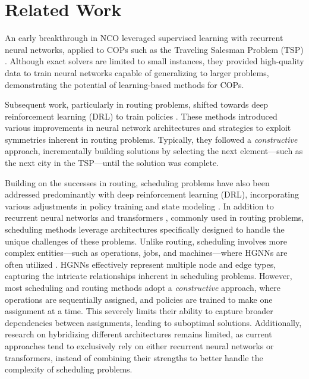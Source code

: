 \section{Related Work}
\label{sec:state_of_the_art}

An early breakthrough in NCO leveraged supervised learning with recurrent neural networks, applied to COPs such as the Traveling Salesman Problem (TSP) \citep{vinyals2015pointer}. Although exact solvers are limited to small instances, they provided high-quality data to train neural networks capable of generalizing to larger problems, demonstrating the potential of learning-based methods for COPs.

Subsequent work, particularly in routing problems, shifted towards deep reinforcement learning (DRL) to train policies \cite{kool2018attention, kwon2020pomo}. These methods introduced various improvements in neural network architectures and strategies to exploit symmetries inherent in routing problems. Typically, they followed a \emph{constructive} approach, incrementally building solutions by selecting the next element—such as the next city in the TSP—until the solution was complete.

Building on the successes in routing, scheduling problems have also been addressed predominantly with deep reinforcement learning (DRL), incorporating various adjustments in policy training and state modeling \cite{song2022flexible, wang2023flexible}. In addition to recurrent neural networks and transformers \cite{tassel2023end, pirnay2024self}, commonly used in routing problems, scheduling methods leverage architectures specifically designed to handle the unique challenges of these problems. Unlike routing, scheduling involves more complex entities—such as operations, jobs, and machines—where HGNNs are often utilized \cite{song2022flexible}. HGNNs effectively represent multiple node and edge types, capturing the intricate relationships inherent in scheduling problems. However, most scheduling and routing methods adopt a \emph{constructive} approach, where operations are sequentially assigned, and policies are trained to make one assignment at a time. This severely limits their ability to capture broader dependencies between assignments, leading to suboptimal solutions. Additionally, research on hybridizing different architectures remains limited, as current approaches tend to exclusively rely on either recurrent neural networks or transformers, instead of combining their strengths to better handle the complexity of scheduling problems.

